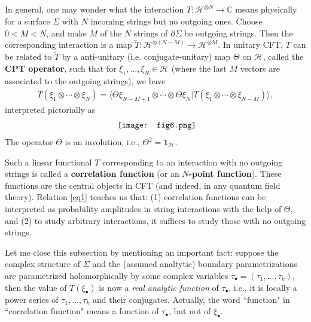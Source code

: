 \documentclass[12pt,a4paper,notitlepage]{article}
\theoremstyle{definition}
\theoremstyle{plain}
\newcommand{\mc}{\mathcal}
\newcommand{\wtd}{\widetilde}
\newcommand{\id}{\mathbf{1}}
\newcommand{\bk}[1]{\langle {#1}\rangle}
\newcommand{\blt}{\bullet}
\newcommand{\Cbb}{\mathbb C}
\numberwithin{equation}{section}
\begin{document}
\subsection{}\label{lb2}

In general, one may wonder what the interaction $T:\mc H^{\otimes N}\rightarrow \Cbb$ means physically for a surface $\Sigma$ with $N$ incoming strings but no outgoing ones.  Choose $0<M<N$, and make $M$ of the $N$ strings of $\partial\Sigma$ be outgoing strings. Then the corresponding interaction is a map $\wtd T:\mc H^{\otimes (N-M)}\rightarrow \mc H^{\otimes M}$. In unitary CFT, $T$ can be related to $\wtd T$ by a anti-unitary (i.e. conjugate-unitary) map $\Theta$  on $\mc H$, called the \textbf{CPT operator}, such that for $\xi_1,\dots,\xi_N\in\mc H$ (where the last $M$ vectors are associated to the outgoing strings), we have
\begin{align}
T(\xi_1\otimes\cdots\otimes\xi_N)=\bk{\Theta \xi_{N-M+1}\otimes\cdots\otimes \Theta \xi_N|\wtd T(\xi_1\otimes\cdots\otimes\xi_{N-M})},	\label{eq1}
\end{align}
interpreted pictorially as
\begin{align*}
	\vcenter{\hbox{{
				\texttt{[image: fig6.png]}}}}
\end{align*}
The operator $\Theta$ is an involution, i.e., $\Theta^2=\id_{\mc H}$.

Such a linear functional $T$ corresponding to an interaction with no outgoing strings is called a \textbf{correlation function} (or an \textbf{$N$-point function}). These functions are the central objects in CFT (and indeed, in any quantum field theory). Relation \eqref{eq1} teaches us that: (1) correlation functions can be interpreted as probability amplitudes in string interactions with the help of $\Theta$, and (2) to study arbitrary interactions, it suffices to study those with no outgoing strings.

Let me close this subsection by mentioning an important fact: suppose the complex structure of $\Sigma$ and the (assumed analtytic) boundary parametrizations are parametrized holomorphically by some complex variables $\tau_\blt=(\tau_1,\dots,\tau_k)$, then the value of $T(\xi_\blt)$ is now a \emph{real analytic function} of $\tau_\blt$, i.e., it is locally a power series of $\tau_1,\dots,\tau_k$ and their conjugates. Actually, the word ``function" in ``correlation function" means a function of $\tau_\blt$, but not of $\xi_\blt$.
\end{document}
